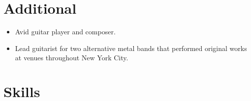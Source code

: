 \documentclass[10pt,letterpaper,roman,final]{moderncv}
\begin{document}

\section{Additional}
\begin{itemize}
  \item Avid guitar player and composer.
  \item Lead guitarist for two alternative metal bands that performed original works at venues throughout New York City.
\end{itemize}

\section{Skills}
\begin{minipage}[t]{0.50\linewidth}
\end{minipage}
\begin{minipage}[t]{0.50\linewidth}
\end{minipage}
\end{document}
